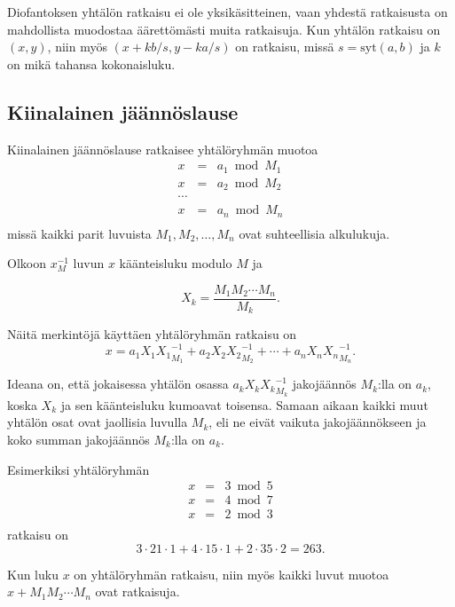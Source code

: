 Diofantoksen yhtälön ratkaisu ei ole yksikäsitteinen,
vaan yhdestä ratkaisusta on mahdollista muodostaa
äärettömästi muita ratkaisuja.
Kun yhtälön ratkaisu on $(x,y)$,
niin myös $(x+k b/s,y-k a/s)$ on ratkaisu,
missä $s=\textrm{syt}(a,b)$ ja $k$
on mikä tahansa kokonaisluku.

\subsection{Kiinalainen jäännöslause}

Kiinalainen jäännöslause ratkaisee yhtälöryhmän muotoa
\[
\begin{array}{lcl}
x & = & a_1 \bmod M_1 \\
x & = & a_2 \bmod M_2 \\
\cdots \\
x & = & a_n \bmod M_n \\
\end{array}
\]
missä kaikki parit luvuista $M_1,M_2,\ldots,M_n$
ovat suhteellisia alkulukuja.

Olkoon $x^{-1}_M$ luvun $x$ käänteisluku
modulo $M$ ja

\[ X_k = \frac{M_1 M_2 \cdots M_n}{M_k}.\]

Näitä merkintöjä käyttäen yhtälöryhmän ratkaisu on
\[x = a_1 X_1 {X_1}^{-1}_{M_1} + a_2 X_2 {X_2}^{-1}_{M_2} + \cdots + a_n X_n {X_n}^{-1}_{M_n}.\]

Ideana on, että jokaisessa yhtälön osassa
$a_k X_k {X_k}^{-1}_{M_k}$
jakojäännös $M_k$:lla on $a_k$,
koska $X_k$ ja sen käänteisluku kumoavat toisensa.
Samaan aikaan kaikki muut yhtälön osat ovat jaollisia luvulla
$M_k$, eli ne eivät vaikuta jakojäännökseen ja
koko summan jakojäännös $M_k$:lla on $a_k$.

Esimerkiksi yhtälöryhmän
\[
\begin{array}{lcl}
x & = & 3 \bmod 5 \\
x & = & 4 \bmod 7 \\
x & = & 2 \bmod 3 \\
\end{array}
\]
ratkaisu on
\[ 3 \cdot 21 \cdot 1 + 4 \cdot 15 \cdot 1 + 2 \cdot 35 \cdot 2 = 263.\]

Kun luku $x$ on yhtälöryhmän ratkaisu,
niin myös kaikki luvut muotoa
$x+M_1 M_2 \cdots M_n$ ovat ratkaisuja.

